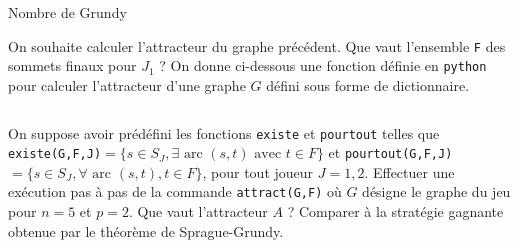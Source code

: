 \begin{exo}[PC][1][devoir]{Nombre de Grundy}
\begin{quest}
  \item On souhaite calculer l'attracteur du graphe précédent. Que vaut l'ensemble \texttt{F} des sommets finaux pour $J_1$ ? On donne ci-dessous une fonction définie en \texttt{python} pour calculer l'attracteur d'une graphe $G$ défini sous forme de dictionnaire.
  \inputminted{python}{\pathtoexos/Info/Scripts/attract_ds.py}
  On suppose avoir prédéfini les fonctions \texttt{existe} et \texttt{pourtout} telles que \texttt{existe(G,F,J)}$=\{s \in S_J, \exists \text{ arc } (s,t) \text{ avec } t \in F\}$ et \texttt{pourtout(G,F,J)}$=\{s \in S_J, \forall \text{ arc } (s,t),  t \in F\}$, pour tout joueur $J=1,2$.
  Effectuer une exécution pas à pas de la commande \texttt{attract(G,F)} où $G$ désigne le graphe du jeu pour $n=5$ et $p=2$.
  Que vaut l'attracteur $A$ ? Comparer à la stratégie gagnante obtenue par le théorème de Sprague-Grundy.
\end{quest}
\end{exo}
